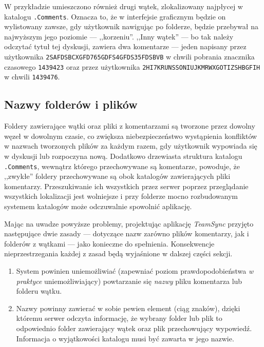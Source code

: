 \documentclass[polish,a4paper,twoside]{ppfcmthesis}
\begin{document}
W przykładzie umieszczono również drugi wątek, zlokalizowany najpłycej w katalogu \texttt{.Comments}. Oznacza to, że w interfejsie graficznym będzie on wylistowany zawsze, gdy użytkownik nawigując po folderze, będzie przebywał na najwyższym jego poziomie --- ,,korzeniu''. ,,Inny wątek'' --- bo tak należy odczytać tytuł tej dyskusji, zawiera dwa komentarze --- jeden napisany przez użytkownika \texttt{2SAFDSB\-CXGFD765\-GDFS4GFDS\-35FDSBVB} w chwili pobrania znacznika czasowego \texttt{1439423} oraz przez użytkownika \texttt{2HI7KRU\-NSSONIUJ\-KMRWXGO\-TIZSHBGFIH} w chwili \texttt{1439476}.

\subsection{Nazwy folderów i plików}

\label{filenamesf}

Foldery zawierające wątki oraz pliki z komentarzami są tworzone przez dowolny węzeł w dowolnym czasie, co zwiększa niebezpieczeństwo wystąpienia konfliktów w nazwach tworzonych plików za każdym razem, gdy użytkownik wypowiada się w dyskusji lub rozpoczyna nową. Dodatkowo drzewiasta struktura katalogu \texttt{.Comments}, wewnątrz którego przechowywane są komentarze, powoduje, że ,,zwykłe'' foldery przechowywane są obok katalogów zawierających pliki komentarzy. Przeszukiwanie ich wszystkich przez serwer poprzez przeglądanie wszystkich lokalizacji jest wolniejsze i przy folderze mocno rozbudowanym systemem katalogów może odczuwalnie spowolnić aplikację.

Mając na uwadze powyższe problemy, projektując aplikację \emph{TeamSync} przyjęto następujące dwie zasady --- dotyczące nazw zarówno plików komentarzy, jak i folderów z wątkami --- jako konieczne do spełnienia. Konsekwencje nieprzestrzegania każdej z zasad będą wyjaśnione w dalszej części sekcji.

\begin{enumerate}[noitemsep]
  \item System powinien uniemożliwiać (zapewniać poziom prawdopodobieństwa \emph{w praktyce} uniemożliwiający) powtarzanie się \emph{nazwy} pliku komentarza lub folderu wątku.
  
  \item Nazwy powinny zawierać w sobie pewien element (ciąg znaków), dzięki któremu serwer odczyta informację, że wybrany folder lub plik to odpowiednio folder zawierający wątek oraz plik przechowujący wypowiedź. Informacja o wyjątkowości katalogu musi być zawarta w jego nazwie.
\end{enumerate}
\end{document}
